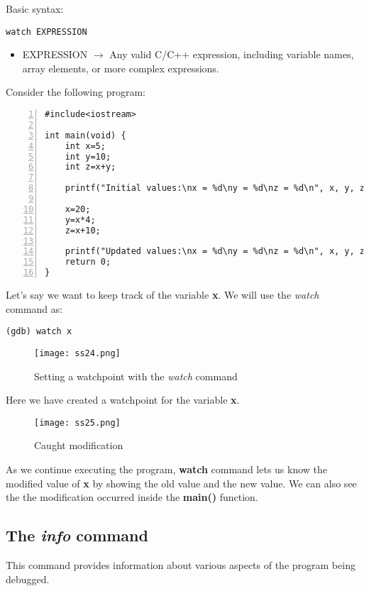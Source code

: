 \documentclass{article}
\makeatletter
\renewcommand\paragraph{\@startsection{paragraph}{4}{\z@}{-3.25ex \@plus -1ex \@minus -.2ex}{1.5ex \@plus .2ex}{\normalfont\normalsize\bfseries}}
\makeatother
\begin{document}
Basic syntax:
\begin{Verbatim}[frame=single]
watch EXPRESSION
\end{Verbatim}

\begin{itemize}
\item EXPRESSION $\rightarrow$ Any valid C/C++ expression, including variable names, array elements, or more complex expressions.
\end{itemize}

Consider the following program:
\begin{Verbatim}[numbers=left, frame=single]
#include<iostream>

int main(void) {
	int x=5;
	int y=10;
	int z=x+y;

	printf("Initial values:\nx = %d\ny = %d\nz = %d\n", x, y, z);

	x=20;
	y=x*4;
	z=x+10;

	printf("Updated values:\nx = %d\ny = %d\nz = %d\n", x, y, z);
	return 0;
}
\end{Verbatim}
\newpage
Let's say we want to keep track of the variable \textbf{x}.
We will use the \textit{watch} command as:
\begin{Verbatim}[frame=single]
(gdb) watch x
\end{Verbatim}

\begin{figure}[h]
\centering
\texttt{[image: ss24.png]}
\caption{Setting a watchpoint with the \textit{watch} command}
\end{figure}

Here we have created a watchpoint for the variable \textbf{x}.

\begin{figure}[h]
\centering
\texttt{[image: ss25.png]}
\caption{Caught modification}
\end{figure}

As we continue executing the program, \textbf{watch} command lets us know the modified value of \textbf{x} by showing the old value and the new value. We can also see the the modification occurred inside the \textbf{main()} function.

\newpage
\subsection{The \textit{info} command}
\paragraph{}
This command provides information about various aspects of the program being debugged.
\end{document}

